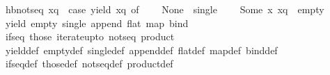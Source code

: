 \begin{isabellebody}
\isanewline
\ \ {\isachardoublequoteopen}hb{\isacharunderscore}{\kern0pt}not{\isacharunderscore}{\kern0pt}seq\ xq\ {\isacharequal}{\kern0pt}\ {\isacharparenleft}{\kern0pt}case\ yield\ xq\ of\isanewline
\ \ \ \ None\ {\isasymRightarrow}\ single\ {\isacharparenleft}{\kern0pt}{\isacharparenright}{\kern0pt}\isanewline
\ \ {\isacharbar}{\kern0pt}\ Some\ {\isacharparenleft}{\kern0pt}x{\isacharcomma}{\kern0pt}\ xq{\isacharparenright}{\kern0pt}\ {\isasymRightarrow}\ empty{\isacharparenright}{\kern0pt}{\isachardoublequoteclose}\isanewline
\isanewline
{}\isamarkupfalse%
\ {\isacharparenleft}{\kern0pt}\ yield\ empty\ single\ append\ flat\ map\ bind\isanewline
\ \ if{\isacharunderscore}{\kern0pt}seq\ those\ iterate{\isacharunderscore}{\kern0pt}upto\ not{\isacharunderscore}{\kern0pt}seq\ product\isanewline
\isanewline
{}\isamarkupfalse%
\ {\isacharparenleft}{\kern0pt}\ yield{\isacharunderscore}{\kern0pt}def\ empty{\isacharunderscore}{\kern0pt}def\ single{\isacharunderscore}{\kern0pt}def\ append{\isacharunderscore}{\kern0pt}def\ flat{\isacharunderscore}{\kern0pt}def\ map{\isacharunderscore}{\kern0pt}def\ bind{\isacharunderscore}{\kern0pt}def\isanewline
\ \ if{\isacharunderscore}{\kern0pt}seq{\isacharunderscore}{\kern0pt}def\ those{\isacharunderscore}{\kern0pt}def\ not{\isacharunderscore}{\kern0pt}seq{\isacharunderscore}{\kern0pt}def\ product{\isacharunderscore}{\kern0pt}def\ \isanewline
%
\isadelimtheory
\isanewline
%
\endisadelimtheory
%
\isatagtheory
{}\isamarkupfalse%
%
\endisatagtheory
{\isafoldtheory}%
%
\isadelimtheory
%
\endisadelimtheory
%
\end{isabellebody}%
\endinput
